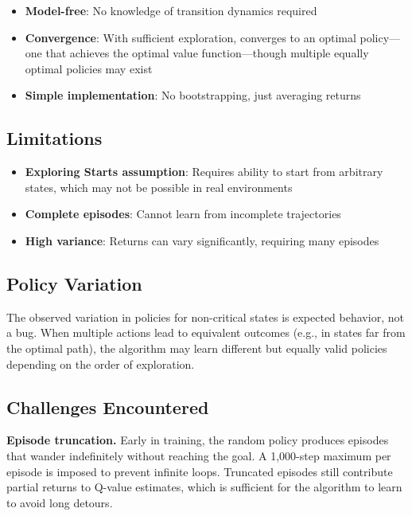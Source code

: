 \documentclass[letterpaper]{article}
\begin{document}
\begin{itemize}
    \item \textbf{Model-free}: No knowledge of transition dynamics required
    \item \textbf{Convergence}: With sufficient exploration, converges to an optimal policy---one that achieves the optimal value function---though multiple equally optimal policies may exist
    \item \textbf{Simple implementation}: No bootstrapping, just averaging returns
\end{itemize}

\subsection{Limitations}

\begin{itemize}
    \item \textbf{Exploring Starts assumption}: Requires ability to start from arbitrary states, which may not be possible in real environments
    \item \textbf{Complete episodes}: Cannot learn from incomplete trajectories
    \item \textbf{High variance}: Returns can vary significantly, requiring many episodes
\end{itemize}

\subsection{Policy Variation}

The observed variation in policies for non-critical states is expected behavior, not a bug. When multiple actions lead to equivalent outcomes (e.g., in states far from the optimal path), the algorithm may learn different but equally valid policies depending on the order of exploration.

\subsection{Challenges Encountered}

\textbf{Episode truncation.} Early in training, the random policy produces episodes that wander indefinitely without reaching the goal. A 1,000-step maximum per episode is imposed to prevent infinite loops. Truncated episodes still contribute partial returns to Q-value estimates, which is sufficient for the algorithm to learn to avoid long detours.
\end{document}

